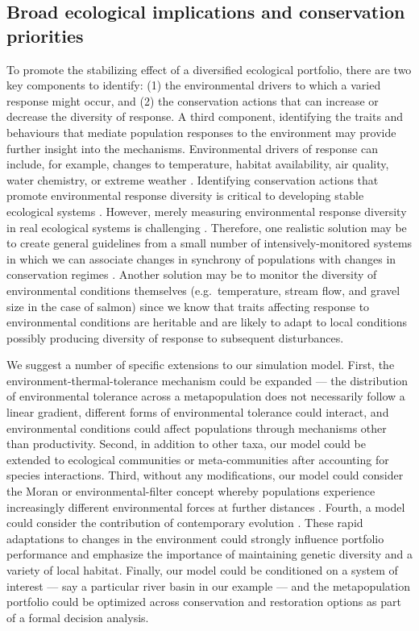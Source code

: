 \documentclass[12pt,english]{article}
\begin{document}
\begin{spacing}{1.3}
\subsection{Broad ecological implications and conservation priorities}\label{broad-ecological-implications-and-conservation-priorities}

To promote the stabilizing effect of a diversified ecological portfolio, there are two key components to identify: (1) the environmental drivers to which a varied response might occur, and (2) the conservation actions that can increase or decrease the diversity of response. A third component, identifying the traits and behaviours that mediate population responses to the environment may provide further insight into the mechanisms. Environmental drivers of response can include, for example, changes to temperature, habitat availability, air quality, water chemistry, or extreme weather \citep{elmqvist2003}. Identifying conservation actions that promote environmental response diversity is critical to developing stable ecological systems \citep{mori2013}. However, merely measuring environmental response diversity in real ecological systems is challenging \citep[albeit possible;][]{thibaut2012}. Therefore, one realistic solution may be to create general guidelines from a small number of intensively-monitored systems in which we can associate changes in synchrony of populations with changes in conservation regimes \citep[e.g.][]{moore2010, carlson2011}. Another solution may be to monitor the diversity of environmental conditions themselves (e.g.~temperature, stream flow, and gravel size in the case of salmon) since we know that traits affecting response to environmental conditions are heritable and are likely to adapt to local conditions \citep{carlson2011} possibly producing diversity of response to subsequent disturbances.

We suggest a number of specific extensions to our simulation model. First, the environment-thermal-tolerance mechanism could be expanded --- the distribution of environmental tolerance across a metapopulation does not necessarily follow a linear gradient, different forms of environmental tolerance could interact, and environmental conditions could affect populations through mechanisms other than productivity. Second, in addition to other taxa, our model could be extended to ecological communities or meta-communities after accounting for species interactions. Third, without any modifications, our model could consider the Moran or environmental-filter concept whereby populations experience increasingly different environmental forces at further distances \citep{schindler2008, rogers2008}. Fourth, a model could consider the contribution of contemporary evolution \citep{stockwell2003}. These rapid adaptations to changes in the environment could strongly influence portfolio performance and emphasize the importance of maintaining genetic diversity and a variety of local habitat. Finally, our model could be conditioned on a system of interest --- say a particular river basin in our example --- and the metapopulation portfolio could be optimized across conservation and restoration options as part of a formal decision analysis.


\end{spacing}
\end{document}
